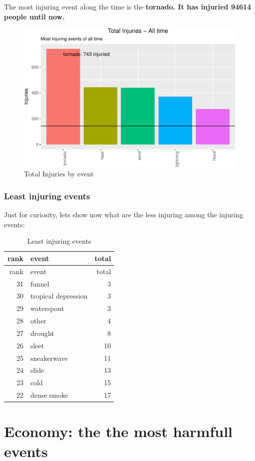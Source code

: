 \documentclass[]{article}
\begin{document}
The most injuring event along the time is the \textbf{tornado. It has
injuried 94614 people until now.}

\begin{figure}[htbp]
\centering
\includegraphics{readme_files/figure-latex/injuring-all-plot-1.pdf}
\caption{Total Injuries by event}
\end{figure}

\subsubsection{Least injuring events}\label{least-injuring-events}

Just for curiosity, lets show now what are the less injuring among the
injuring events:

\begin{longtable}[]{@{}rlr@{}}
\caption{Least injuring events}\tabularnewline
\toprule
rank & event & total\tabularnewline
\midrule
\endfirsthead
\toprule
rank & event & total\tabularnewline
\midrule
\endhead
31 & funnel & 3\tabularnewline
30 & tropical depression & 3\tabularnewline
29 & waterspout & 3\tabularnewline
28 & other & 4\tabularnewline
27 & drought & 8\tabularnewline
26 & sleet & 10\tabularnewline
25 & sneakerwave & 11\tabularnewline
24 & slide & 13\tabularnewline
23 & cold & 15\tabularnewline
22 & dense smoke & 17\tabularnewline
\bottomrule
\end{longtable}

\section{Economy: the the most harmfull
events}\label{economy-the-the-most-harmfull-events}
\end{document}
